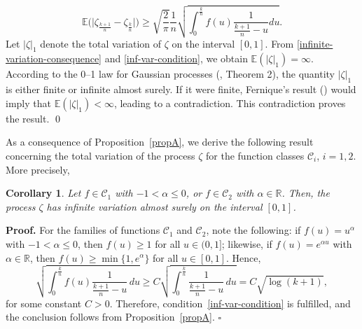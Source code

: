 \documentclass[preprint,12pt,authoryear]{elsarticle}
\def\E{\mathbb{E}}
\newtheorem{cor}{Corollary}
\begin{document}
\begin{equation}\label{infinite-variation-consequence}
        \E\Bigg(\Bigg|\zeta_{\frac{k+1}{n}}-\zeta_{\frac{k}{n}}\Bigg|\Bigg)
        \geq \sqrt{\frac{2}{\pi}}\frac{1}{n} \sqrt{\int_0^\frac{k}{n} f(u)\frac{1}{\frac{k+1}{n}-u}du}.
\end{equation}
Let \( |\zeta|_1 \) denote the total variation of \( \zeta \) on the interval \([0,1]\). From \eqref{infinite-variation-consequence} and \eqref{inf-var-condition}, we obtain \( \mathbb{E}(|\zeta|_1) = \infty \). According to the 0–1 law for Gaussian processes (\cite{Camb-Raj1973}, Theorem 2), the quantity \( |\zeta|_1 \) is either finite or infinite almost surely. If it were finite, Fernique's result (\cite{Fernique}) would imply that \( \mathbb{E}(|\zeta|_1) < \infty \), leading to a contradiction. This contradiction proves the result. \qed





As a consequence of Proposition~\ref{propA}, we derive the following result concerning the total variation of the process $\zeta$ for the function classes $\mathcal{C}_i$, $i = 1, 2$. More precisely,

\begin{cor}\label{corA}
Let \( f \in \mathcal{C}_1 \) with \( -1 < \alpha \leq 0 \), or \( f \in \mathcal{C}_2 \) with \( \alpha \in \mathbb{R} \). Then, the process \( \zeta \) has infinite variation almost surely on the interval \( [0,1] \).
\end{cor}

\smallskip
\noindent\textbf{Proof.} For the families of functions \( \mathcal{C}_1 \) and \( \mathcal{C}_2 \), note the following: if \( f(u) = u^\alpha \) with \( -1 < \alpha \leq 0 \), then \( f(u) \geq 1 \) for all \( u \in (0,1] \); likewise, if \( f(u) = e^{\alpha u} \) with \( \alpha \in \mathbb{R} \), then \( f(u) \geq \min\{1, e^{\alpha}\} \) for all \( u \in [0,1] \). Hence,
\[
\sqrt{\int_0^{\frac{k}{n}} f(u)\frac{1}{\frac{k+1}{n} - u} \, du} \geq 
C \sqrt{\int_0^{\frac{k}{n}} \frac{1}{\frac{k+1}{n} - u} \, du} 
= C \sqrt{\log(k+1)},
\]
for some constant \( C > 0 \). Therefore, condition~\eqref{inf-var-condition} is fulfilled, and the conclusion follows from Proposition~\ref{propA}.
\hfill\(\square\)

\end{document}
